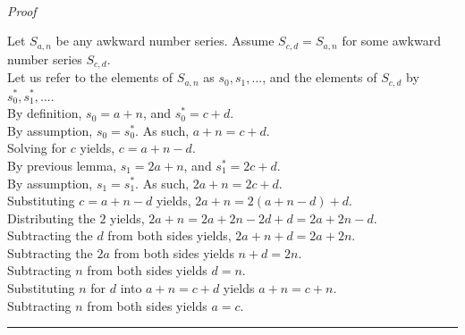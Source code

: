 \documentclass[a4paper,12pt]{article}
\begin{document}
\noindent \\
\textit{Proof}

\noindent Let $S_{a,n}$ be any awkward number series. Assume $S_{c, d} = S_{a, n}$ for some awkward number series $S_{c,d}$.\\


\noindent Let us refer to the elements of $S_{a,n}$ as $s_0, s_1, ...$, and the elements of $S_{c,d}$ by $s^*_0, s^*_1, ...$.\\

\noindent By definition, $s_0 = a + n$, and $s^*_0 = c + d$.\\

\noindent By assumption, $s_0 = s^*_0$. As such, $a + n = c + d$.\\

\noindent Solving for $c$ yields, $c = a + n - d$.\\

\noindent By previous lemma, $s_1 = 2a + n$, and $s^*_1 = 2c + d$.\\

\noindent By assumption, $s_1 = s^*_1$. As such, $2a + n = 2c + d$.\\

\noindent Substituting $c = a + n - d$ yields, $2a + n = 2(a + n - d) + d$.\\

\noindent Distributing the $2$ yields, $2a + n = 2a + 2n - 2d + d = 2a + 2n - d$.\\

\noindent Subtracting the $d$ from both sides yields, $2a + n + d = 2a + 2n$.\\

\noindent Subtracting the $2a$ from both sides yields $n + d = 2n$.\\

\noindent Subtracting $n$ from both sides yields $d = n$.\\

\noindent Substituting $n$ for $d$ into $a + n = c + d$ yields $a + n = c + n$.\\

\noindent Subtracting $n$ from both sides yields $a = c$.

\begin{center}
\noindent\rule{8cm}{0.4pt}
\end{center}
\end{document}
